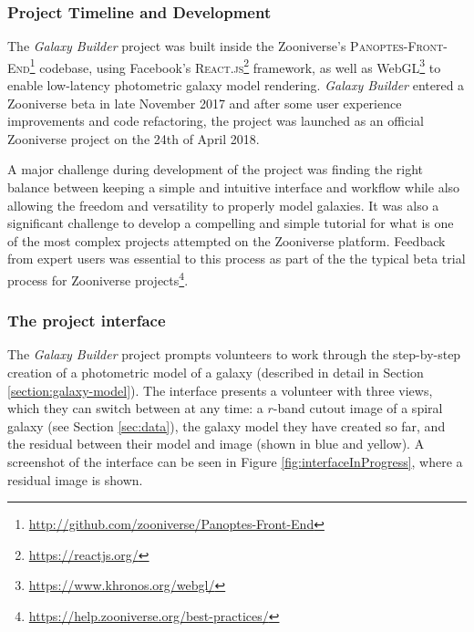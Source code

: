 \documentclass[../main.tex]{subfiles}
\begin{document}
\subsubsection{Project Timeline and Development}

The \textit{Galaxy Builder} project was built inside the Zooniverse's \citep{Simpson:2014:ZOW:2567948.2579215} \textsc{Panoptes-Front-End}\footnote{\url{http://github.com/zooniverse/Panoptes-Front-End}} codebase, using Facebook's \textsc{React.js}\footnote{\url{https://reactjs.org/}} framework, as well as WebGL\footnote{\url{https://www.khronos.org/webgl/}} to enable low-latency photometric galaxy model rendering. \textit{Galaxy Builder} entered a Zooniverse beta in late November 2017 and after some user experience improvements and code refactoring, the project was launched as an official Zooniverse project on the 24th of April 2018.

A major challenge during development of the project was finding the right balance between keeping a simple and intuitive interface and workflow while also allowing the freedom and versatility to properly model galaxies. It was also a significant challenge to develop a compelling and simple tutorial for what is one of the most complex projects attempted on the Zooniverse platform. Feedback from expert users was essential to this process as part of the the typical beta trial process for Zooniverse projects\footnote{\url{https://help.zooniverse.org/best-practices/}}.


\subsubsection{The project interface}

The \textit{Galaxy Builder} project prompts volunteers to work through the step-by-step creation of a photometric model of a galaxy (described in detail in Section \ref{section:galaxy-model}). The interface presents a volunteer with three views, which they can switch between at any time: a $r$-band cutout image of a spiral galaxy (see Section \ref{sec:data}), the galaxy model they have created so far, and the residual between their model and image (shown in blue and yellow). A screenshot of the interface can be seen in Figure \ref{fig:interfaceInProgress}, where a residual image is shown.
\end{document}
